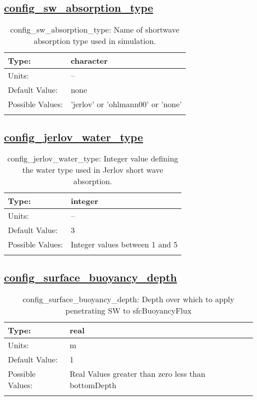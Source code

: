 \subsection[config\_sw\_absorption\_type]{\hyperref[sec:nm_tab_shortwaveRadiation]{config\_sw\_absorption\_type}}
\label{subsec:nm_sec_config_sw_absorption_type}
\begin{center}
\begin{longtable}{| p{2.0in} || p{4.0in} |}
    \hline
    Type: & character \\
    \hline
    Units: & -- \\
    \hline
    Default Value: & none \\
    \hline
    Possible Values: & 'jerlov' or 'ohlmann00' or 'none' \\
    \hline
    \caption{config\_sw\_absorption\_type: Name of shortwave absorption type used in simulation. }
\end{longtable}
\end{center}
\subsection[config\_jerlov\_water\_type]{\hyperref[sec:nm_tab_shortwaveRadiation]{config\_jerlov\_water\_type}}
\label{subsec:nm_sec_config_jerlov_water_type}
\begin{center}
\begin{longtable}{| p{2.0in} || p{4.0in} |}
    \hline
    Type: & integer \\
    \hline
    Units: & -- \\
    \hline
    Default Value: & 3 \\
    \hline
    Possible Values: & Integer values between 1 and 5 \\
    \hline
    \caption{config\_jerlov\_water\_type: Integer value defining the water type used in Jerlov short wave absorption.}
\end{longtable}
\end{center}
\subsection[config\_surface\_buoyancy\_depth]{\hyperref[sec:nm_tab_shortwaveRadiation]{config\_surface\_buoyancy\_depth}}
\label{subsec:nm_sec_config_surface_buoyancy_depth}
\begin{center}
\begin{longtable}{| p{2.0in} || p{4.0in} |}
    \hline
    Type: & real \\
    \hline
    Units: & \si{m} \\
    \hline
    Default Value: & 1 \\
    \hline
    Possible Values: & Real Values greater than zero less than bottomDepth \\
    \hline
    \caption{config\_surface\_buoyancy\_depth: Depth over which to apply penetrating SW to sfcBuoyancyFlux}
\end{longtable}
\end{center}
